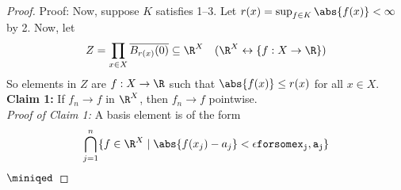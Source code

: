 \begin{proof}{Proof:}
    Now, suppose $K$ satisfies 1--3. Let $r(x) = \sup_{f \in K} \abs{f(x)} < \infty$ by 2. Now, let
    \[ Z = \prod_{x \in X} \overline{B_{r(x)}(0)} \subseteq \R^{X} \quad (\R^X \leftrightarrow \{f : X \to \R\}) \]
    So elements in $Z$ are $f : X \to \R$ such that $\abs{f(x)} \leq r(x)$ for all $x \in X$.\\

    \textbf{Claim 1:} If $f_n \to f$ in $\R^{X}$, then $f_n \to f$ pointwise.\\

    \textit{Proof of Claim 1:} A basis element is of the form
    \[ \bigcap_{j = 1}^{n} \{f \in \R^{X} \mid \abs{f(x_j) - a_j} < \epsilon \tt{ for some } x_j, a_j\} \]
    $\miniqed$


\end{proof}

